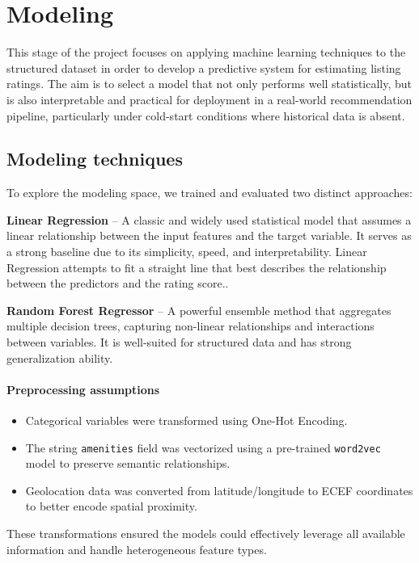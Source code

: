 \section{Modeling}
\label{chap:modeling}
This stage of the project focuses on applying machine learning techniques to the structured dataset in order to develop a predictive system for estimating listing ratings. The aim is to select a model that not only performs well statistically, but is also interpretable and practical for deployment in a real-world recommendation pipeline, particularly under cold-start conditions where historical data is absent.

\subsection{Modeling techniques}
To explore the modeling space, we trained and evaluated two distinct approaches:

\textbf{Linear Regression } – A classic and widely used statistical model that assumes a linear relationship between the input features and the target variable. It serves as a strong baseline due to its simplicity, speed, and interpretability. Linear Regression attempts to fit a straight line that best describes the relationship between the predictors and the rating score..

\textbf{Random Forest Regressor } – A powerful ensemble method that aggregates multiple decision trees, capturing non-linear relationships and interactions between variables. It is well-suited for structured data and has strong generalization ability.

\paragraph{Preprocessing assumptions}
\begin{itemize}
    \item Categorical variables were transformed using One-Hot Encoding.
    \item The string \texttt{amenities} field was vectorized using a pre-trained \texttt{word2vec} model to preserve semantic relationships.
    \item Geolocation data was converted from latitude/longitude to ECEF coordinates to better encode spatial proximity.
\end{itemize}

These transformations ensured the models could effectively leverage all available information and handle heterogeneous feature types.

